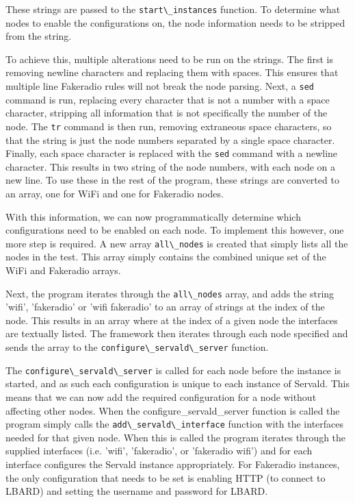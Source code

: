 These strings are passed to the \verb|start\_instances| function. 
To determine what nodes to enable the configurations on, the node information needs to be stripped from the string.

To achieve this, multiple alterations need to be run on the strings.
The first is removing newline characters and replacing them with spaces.
This ensures that multiple line Fakeradio rules will not break the node parsing.
Next, a \verb|sed| command is run, replacing every character that is not a number with a space character, stripping all information that is not specifically the number of the node.
The \verb|tr| command is then run, removing extraneous space characters, so that the string is just the node numbers separated by a single space character.
Finally, each space character is replaced with the \verb|sed| command with a newline character.
This results in two string of the node numbers, with each node on a new line.
To use these in the rest of the program, these strings are converted to an array, one for WiFi and one for Fakeradio nodes.

With this information, we can now programmatically determine which configurations need to be enabled on each node.
To implement this however, one more step is required.
A new array \verb|all\_nodes| is created that simply lists all the nodes in the test.
This array simply contains the combined unique set of the WiFi and Fakeradio arrays.

Next, the program iterates through the \verb|all\_nodes| array, and adds the string 'wifi', 'fakeradio' or 'wifi fakeradio' to an array of strings at the index of the node.
This results in an array where at the index of a given node the interfaces are textually listed.
The framework then iterates through each node specified and sends the array to the \verb|configure\_servald\_server| function.


The \verb|configure\_servald\_server| is called for each node before the instance is started, and as such each configuration is unique to each instance of Servald.
This means that we can now add the required configuration for a node without affecting other nodes.
When the configure\_servald\_server function is called the program simply calls the \verb|add\_servald\_interface| function with the interfaces needed for that given node.
When this is called the program iterates through the supplied interfaces (i.e. 'wifi', 'fakeradio', or 'fakeradio wifi') and for each interface configures the Servald instance appropriately.
For Fakeradio instances, the only configuration that needs to be set is enabling HTTP (to connect to LBARD) and setting the username and password for LBARD.

